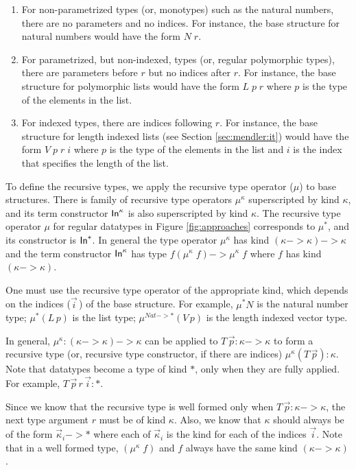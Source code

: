 \begin{enumerate}

\item For non-parametrized types (or, monotypes) such as the natural numbers,
there are no parameters and no indices. For instance, the base structure
for natural numbers would have the form $N\;r$. 

\item For parametrized,
but non-indexed, types (or, regular polymorphic types), there are parameters
before $r$ but no indices after $r$. For instance, the base structure for
polymorphic lists would have the form $L\;p\;r$ where $p$ is the type of
the elements in the list. 

\item For indexed types, there are indices following $r$.
For instance, the base structure for length indexed lists
(see Section \ref{sec:mendler:it}) would have the
form $V\;p\;r\;i$ where $p$ is the type of the elements in the list and
$i$ is the index that specifies the length of the list.

\end{enumerate}

To define the recursive types, we apply the recursive type operator ($\mu$) to
base structures. There is  family of recursive type operators $\mu^\kappa$
superscripted by kind $\kappa$, and its term constructor $\textsf{In}^\kappa$ is also
superscripted by kind $\kappa$. The recursive type operator $\mu$
for regular datatypes in Figure \ref{fig:approaches} corresponds to $\mu^{*}$,
and its constructor is $\textsf{In}^{*}$. In general the type operator $\mu^\kappa$
has kind $(\kappa -> \kappa) -> \kappa$ and the term constructor
$\textsf{In}^\kappa$ has type $f (\mu^\kappa\; f) -> \mu^\kappa\; f$ where
$f$ has kind $(\kappa -> \kappa)$.

One must use the recursive type operator of the appropriate kind,
which depends on the indices ($\vec{i}\,$) of the base structure.
For example, $\mu^{*}N$ is the natural number type;
$\mu^{*}(L\,p)$ is the list type; $\mu^{\textit{Nat}-> *}(V\,p)$ is the length indexed vector type.

In general, $\mu^\kappa : (\kappa -> \kappa) -> \kappa$ can be
applied to $T\,\vec{p} : \kappa -> \kappa$ to form a recursive type
(or, recursive type constructor, if there are indices)
$\mu^\kappa(T\,\vec{p}) : \kappa$. Note that datatypes become a type of
kind $*$, only when they are fully applied. For example,
$T\,\vec{p}\,r\,\vec{i} : *$. 

Since we know that the recursive type is
well formed only when $T\,\vec{p} : \kappa -> \kappa$,
the next type argument $r$ must be of kind $\kappa$.
Also, we know that $\kappa$ should always be of the form
$\vec{\kappa}_i -> *$ where each of $\vec{\kappa}_i$ is the kind for
each of the indices $\vec{i}$. Note that in a well formed
type, $(\mu^\kappa\; f)$ and $f$ always have the same
kind $(\kappa -> \kappa)$.


